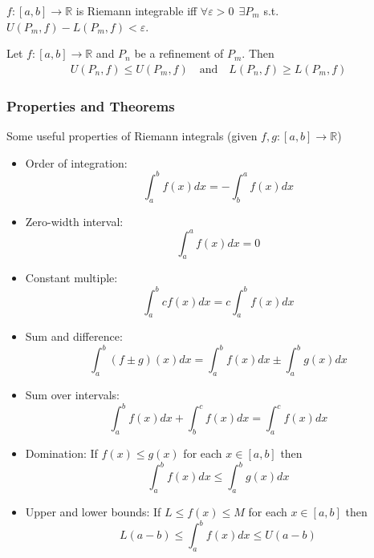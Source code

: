 \documentclass{article}
\begin{document}
\begin{theorem}
  $f: [a, b] \to \mathbb{R}$ is Riemann integrable iff $\forall \varepsilon > 0 ~~ \exists P_m$ s.t. $U(P_m, f) - L(P_m, f) < \varepsilon$.
\end{theorem}

\begin{theorem}
  Let $f: [a, b] \to \mathbb{R}$ and $P_n$ be a refinement of $P_m$. Then
  \begin{align*}
    U(P_n, f) \le U(P_m, f)
    \quad\text{and}\quad
    L(P_n, f) \ge L(P_m, f)
  \end{align*}
\end{theorem}

\subsubsection{Properties and Theorems}
\label{ssub:properties_and_theorems}

Some useful properties of Riemann integrals (given $f, g: [a, b] \to \mathbb{R}$)
\begin{itemize}[label=$\bullet$]
  \item Order of integration:
    \[
      \int_{a}^{b} f(x) dx
      =
      - \int_{b}^{a} f(x) dx
    \]

  \item Zero-width interval:
    \[
      \int_{a}^{a} f(x) dx
      =
      0
    \]

  \item Constant multiple:
    \[
      \int_{a}^{b} c f(x) dx
      =
      c \int_{a}^{b} f(x) dx
    \]

  \item Sum and difference:
    \[
      \int_{a}^{b} (f \pm g)(x) dx
      =
      \int_{a}^{b} f(x) dx
      \pm
      \int_{a}^{b} g(x) dx
    \]

  \item Sum over intervals:
    \[
      \int_{a}^{b} f(x) dx
      +
      \int_{b}^{c} f(x) dx
      =
      \int_{a}^{c} f(x) dx
    \]

  \item Domination: If $f(x) \le g(x)$ for each $x \in [a, b]$ then
    \[
      \int_{a}^{b} f(x) dx
      \le
      \int_{a}^{b} g(x) dx
    \]

  \item Upper and lower bounds: If $L \le f(x) \le M$ for each $x \in [a, b]$ then
    \[
      L(a - b)
      \le
      \int_{a}^{b} f(x) dx
      \le
      U(a - b)
    \]
\end{itemize}
\end{document}
